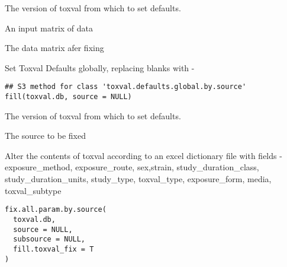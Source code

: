 \documentclass[letterpaper]{book}
\begin{document}
%
\begin{Arguments}
\begin{ldescription}
\item[\code{toxval.db}] The version of toxval from which to set defaults.

\item[\code{mat}] An input matrix of data
\end{ldescription}
\end{Arguments}
%
\begin{Value}
The data matrix afer fixing
\end{Value}
%
\begin{Description}\relax
Set Toxval Defaults globally,  replacing blanks with -
\end{Description}
%
\begin{Usage}
\begin{verbatim}
## S3 method for class 'toxval.defaults.global.by.source'
fill(toxval.db, source = NULL)
\end{verbatim}
\end{Usage}
%
\begin{Arguments}
\begin{ldescription}
\item[\code{toxval.db}] The version of toxval from which to set defaults.

\item[\code{source}] The source to be fixed
\end{ldescription}
\end{Arguments}
%
\begin{Description}\relax
Alter the contents of toxval according to an excel dictionary file with fields -
exposure\_method, exposure\_route, sex,strain, study\_duration\_class, study\_duration\_units, study\_type,
toxval\_type, exposure\_form, media, toxval\_subtype
\end{Description}
%
\begin{Usage}
\begin{verbatim}
fix.all.param.by.source(
  toxval.db,
  source = NULL,
  subsource = NULL,
  fill.toxval_fix = T
)
\end{verbatim}
\end{Usage}
\end{document}
